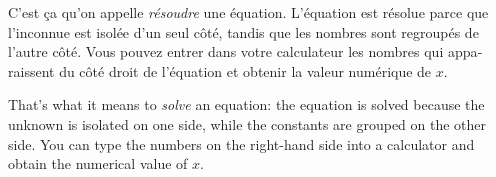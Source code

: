 \begin{paracol}{2}

	\begin{leftcolumn*}

		\begin{otherlanguage}{french}
	C'est ça qu'on appelle \emph{résoudre} une équation.
	L'équation est résolue parce que l'inconnue est isolée d'un seul côté,
	tandis que les nombres sont regroupés de l'autre côté.
	Vous pouvez entrer dans votre calculateur les nombres qui apparaissent du côté droit de l'équation et 
	obtenir la valeur numérique de $x$.


		\end{otherlanguage}

	\end{leftcolumn*}



	\begin{rightcolumn}

	\noindent
	That's what it means to \emph{solve} an equation:
	the equation is solved because the unknown is isolated on one side,
	while the constants are grouped on the other side.
	You can type the numbers on the right-hand side into a calculator and obtain the numerical value of $x$.



	\end{rightcolumn}

\end{paracol}

